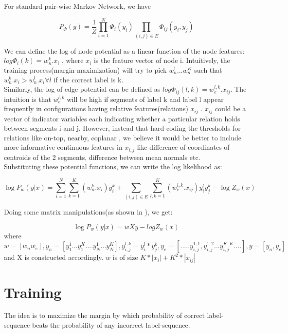 \documentclass[11pt,a4paper,oneside]{report}
\begin{document}
For standard pair-wise Markov Network, we have 

\begin{equation}
  P_\Phi (y) = \frac{1}{Z} \prod_{i=1}^{N} \Phi_i(y_i) \prod_{(i,j)\in E} \Phi_{ij}(y_i,y_j)
  \end{equation}
  
  We can define the log of node potential as a linear function of the node features:  $log \Phi_i(k) = w_n^k.x_i$ , 
where $x_i$ is the feature vector of node i. Intuitively, the training process(margin-maximization) will try to pick $w_n^1...w_n^K$ such that $w_n^k.x_i>w_n^l.x_i \forall l$ if the correct label is k.\\
  Similarly, the log of edge potential can be defined as $log \Phi_{ij}(l,k) = w_{e}^{l,k}.x_{ij}$. The intuition is that $w_{e}^{l,k}$ will be high if segments of label k and label l appear frequently in configurations having relative features(relations) $x_{ij}$ . $x_{ij}$ could be a vector of indicator variables each indicating whether a particular relation holds between segments i and j.
However, instead that hard-coding the thresholds for relations like on-top, nearby, coplanar , we believe it would be better to include more informative continuous features in $x_{i,j}$ like difference of coordinates of centroids of the 2 segments, difference between mean normals etc.\\

Substituting these potential functions, we can write the log likelihood as: 

\begin{equation}
 \log P_w (y|x) = \sum_{i=1}^{N} \sum_{k=1}^{K} (w^{k}_{n}.x_{i})y_{i}^{k} + \sum_{(i,j)\in E} \sum_{l,k=1}^{K} (w_{e}^{l,k}.x_{ij})y_i^l y_j^k   -   \log Z_w(x)
\end{equation}

Doing some matrix manipulations(as shown in \cite{taskar2004learning}), we get:

\begin{equation}
 \log P_w (y|x) = wXy -logZ_w(x)
\end{equation}
where $w=[w_n w_e], y_n=[y_1^1...y_1^K....y_N^1...y_N^K],y_{i,j}^{l,k}=y_i^l*y_j^k,y_e=[ .....y_{i,j}^{1,1},y_{i,j}^{1,2}...y_{i,j}^{K,K} ....], y=[y_n,y_e]$ and X is constructed accordingly.
$w$ is of size $K*|x_i|+K^2*|x_{ij}|$

\section{Training}
The idea is to maximize the margin by which probability of correct label-sequence beats the probability of any incorrect label-sequence.
\end{document}
